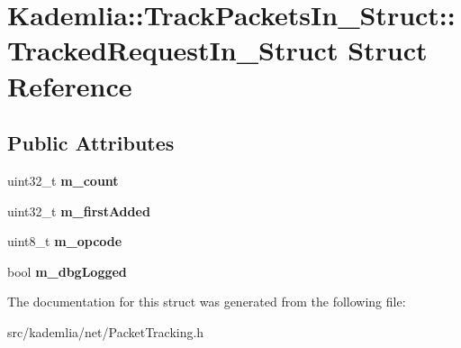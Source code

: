 \section{Kademlia::TrackPacketsIn\_\-Struct::TrackedRequestIn\_\-Struct Struct Reference}
\label{structKademlia_1_1TrackPacketsIn__Struct_1_1TrackedRequestIn__Struct}
\subsection*{Public Attributes}
\begin{DoxyCompactItemize}
\item 
uint32\_\-t {\bfseries m\_\-count}\label{structKademlia_1_1TrackPacketsIn__Struct_1_1TrackedRequestIn__Struct_ad251205657aa0cd73004f649d45442b6}

\item 
uint32\_\-t {\bfseries m\_\-firstAdded}\label{structKademlia_1_1TrackPacketsIn__Struct_1_1TrackedRequestIn__Struct_a656e3c9acf1156cc828e1a9fad88760f}

\item 
uint8\_\-t {\bfseries m\_\-opcode}\label{structKademlia_1_1TrackPacketsIn__Struct_1_1TrackedRequestIn__Struct_a6bb872902a0a5900b67fdbbfd31c675a}

\item 
bool {\bfseries m\_\-dbgLogged}\label{structKademlia_1_1TrackPacketsIn__Struct_1_1TrackedRequestIn__Struct_afdfa215b059453cc94ac11c75284fd1d}

\end{DoxyCompactItemize}


The documentation for this struct was generated from the following file:\begin{DoxyCompactItemize}
\item 
src/kademlia/net/PacketTracking.h\end{DoxyCompactItemize}
